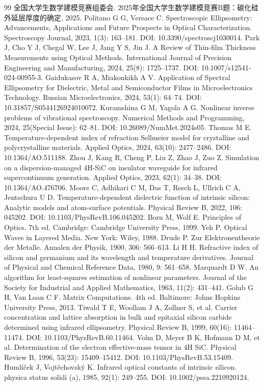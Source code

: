 \begin{thebibliography}{99}
 全国大学生数学建模竞赛组委会. 2025年全国大学生数学建模竞赛B题：碳化硅外延层厚度的确定, 2025.
 Politano G G, Versace C. Spectroscopic Ellipsometry: Advancements, Applications and Future Prospects in Optical Characterization. Spectroscopy Journal, 2023, 1(3): 163--181. DOI: 10.3390/spectroscj1030014.
 Park J, Cho Y J, Chegal W, Lee J, Jang Y S, Jin J. A Review of Thin-film Thickness Measurements using Optical Methods. International Journal of Precision Engineering and Manufacturing, 2024, 25(8): 1725--1737. DOI: 10.1007/s12541-024-00955-3.
 Gaidukasov R A, Miakonkikh A V. Application of Spectral Ellipsometry for Dielectric, Metal and Semiconductor Films in Microelectronics Technology. Russian Microelectronics, 2024, 53(1): 64--74. DOI: 10.31857/S0544126924010072.
 Kuramshina G M, Yagola A G. Nonlinear inverse problems of vibrational spectroscopy. Numerical Methods and Programming, 2024, 25(Special Issue): 62--81. DOI: 10.26089/NumMet.2024s05.
 Thomas M E. Temperature-dependent index of refraction Sellmeier model for crystalline and polycrystalline materials. Applied Optics, 2024, 63(10): 2477--2486. DOI: 10.1364/AO.511188.
 Zhou J, Kang R, Cheng P, Liu Z, Zhao J, Zuo Z. Simulation on a dispersion-managed 4H-SiC on insulator waveguide for infrared supercontinuum generation. Applied Optics, 2023, 62(1): 34--38. DOI: 10.1364/AO.476706.
 Moore C, Adhikari C M, Das T, Resch L, Ullrich C A, Jentschura U D. Temperature-dependent dielectric function of intrinsic silicon: Analytic models and atom-surface potentials. Physical Review B, 2022, 106: 045202. DOI: 10.1103/PhysRevB.106.045202.
 Born M, Wolf E. Principles of Optics. 7th ed. Cambridge: Cambridge University Press, 1999.
 Yeh P. Optical Waves in Layered Media. New York: Wiley, 1988.
 Drude P. Zur Elektronentheorie der Metalle. Annalen der Physik, 1900, 306: 566--613.
 Li H H. Refractive index of silicon and germanium and its wavelength and temperature derivatives. Journal of Physical and Chemical Reference Data, 1980, 9: 561--658.
 Marquardt D W. An algorithm for least-squares estimation of nonlinear parameters. Journal of the Society for Industrial and Applied Mathematics, 1963, 11(2): 431--441.
 Golub G H, Van Loan C F. Matrix Computations. 4th ed. Baltimore: Johns Hopkins University Press, 2013.
 Tiwald T E, Woollam J A, Zollner S, et al. Carrier concentration and lattice absorption in bulk and epitaxial silicon carbide determined using infrared ellipsometry. Physical Review B, 1999, 60(16): 11464--11474. DOI: 10.1103/PhysRevB.60.11464.
 Volm D, Meyer B K, Hofmann D M, et al. Determination of the electron effective-mass tensor in 4H SiC. Physical Review B, 1996, 53(23): 15409--15412. DOI: 10.1103/PhysRevB.53.15409.
 Huml\'{i}\v{c}ek J, Vojt\v{e}chovsk\'{y} K. Infrared optical constants of intrinsic silicon. physica status solidi (a), 1985, 92(1): 249--255. DOI: 10.1002/pssa.2210920124.
\end{thebibliography}
